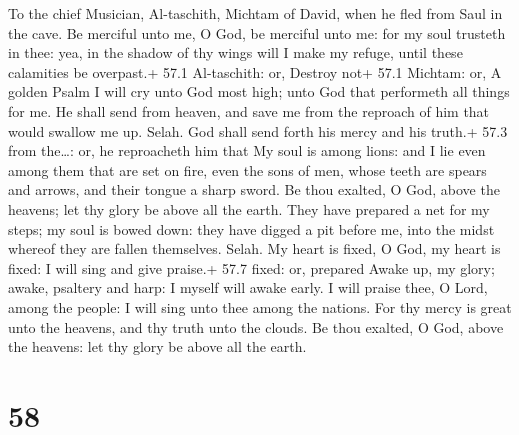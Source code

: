 To the chief Musician, Al-taschith, Michtam of David, when he fled from
Saul in the cave.  Be merciful unto me, O God, be merciful
unto me: for my soul trusteth in thee: yea, in the shadow of thy wings
will I make my refuge, until these calamities be overpast.+ 57.1
Al-taschith: or, Destroy not+ 57.1 Michtam: or, A golden Psalm
 I will cry unto God most high; unto God that performeth all
things for me.  He shall send from heaven, and save me from
the reproach of him that would swallow me up. Selah. God shall send
forth his mercy and his truth.+ 57.3 from the\ldots: or, he reproacheth
him that  My soul is among lions: and I lie even among them
that are set on fire, even the sons of men, whose teeth are spears and
arrows, and their tongue a sharp sword.  Be thou exalted, O
God, above the heavens; let thy glory be above all the earth.
 They have prepared a net for my steps; my soul is bowed
down: they have digged a pit before me, into the midst whereof they are
fallen themselves. Selah.  My heart is fixed, O God, my
heart is fixed: I will sing and give praise.+ 57.7 fixed: or, prepared
 Awake up, my glory; awake, psaltery and harp: I myself will
awake early.  I will praise thee, O Lord, among the people:
I will sing unto thee among the nations.  For thy mercy is
great unto the heavens, and thy truth unto the clouds.  Be
thou exalted, O God, above the heavens: let thy glory be above all the
earth.

\hypertarget{section-57}{%
\section{58}\label{section-57}}

